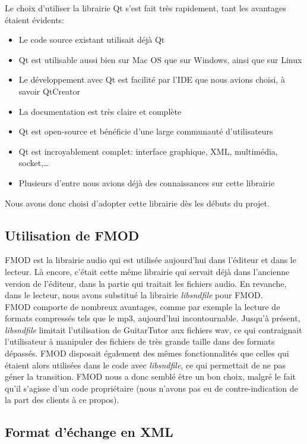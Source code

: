 \documentclass[a4paper,11pt]{article}
\begin{document}
Le choix d'utiliser la librairie Qt s'est fait très rapidement, tant les avantages étaient évidents:
\begin{itemize}
 \item Le code source existant utilisait déjà Qt
 \item Qt est utilisable aussi bien sur Mac OS que sur Windows, ainsi que sur Linux
 \item Le développement avec Qt est facilité par l'IDE que nous avions choisi, à savoir QtCreator
 \item La documentation est très claire et complète
 \item Qt est open-source et bénéficie d'une large communauté d'utilisateurs
 \item Qt est incroyablement complet: interface graphique, XML, multimédia, socket,\dots
 \item Plusieurs d'entre nous avions déjà des connaissances sur cette librairie
\end{itemize}

Nous avons donc choisi d'adopter cette librairie dès les débuts du projet.

\subsection{Utilisation de FMOD}

FMOD est la librairie audio qui est utilisée aujourd'hui dans l'éditeur et dans le lecteur. Là encore, c'était cette même librairie qui servait déjà dans l'ancienne version de l'éditeur, dans la partie qui traitait les fichiers audio. En revanche, dans le lecteur, nous avons substitué la librairie \textit{libsndfile} pour FMOD.\\

FMOD comporte de nombreux avantages, comme par exemple la lecture de formats compressés tels que le mp3, aujourd'hui incontournable. Jusqu'à présent, \textit{libsndfile} limitait l'utilisation de GuitarTutor aux fichiers wav, ce qui contraignait l'utilisateur à manipuler des fichiers de très grande taille dans des formats dépassés. FMOD disposait également des mêmes fonctionnalités que celles qui étaient alors utilisées dans le code avec \textit{libsndfile}, ce qui permettait de ne pas géner la transition. FMOD nous a donc semblé être un bon choix, malgré le fait qu'il s'agisse d'un code propriétaire (nous n'avons pas eu de contre-indication de la part des clients à ce propos).

\subsection{Format d'échange en XML}
\end{document}
